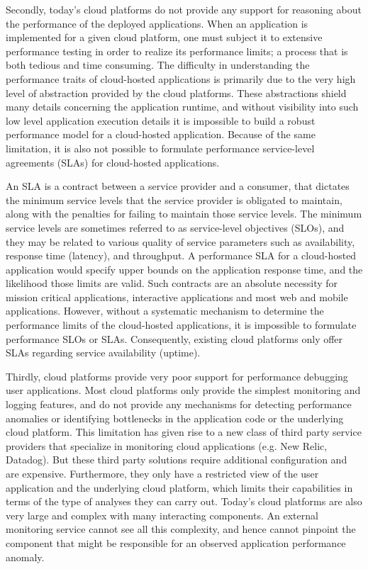 Secondly, today's cloud platforms do not provide any support for reasoning about the 
performance of the deployed applications. When an application is implemented for
a given cloud platform, one must subject it to extensive performance testing in order
to realize its performance limits; a process that is both 
tedious and time consuming. The difficulty in understanding the performance 
traits of cloud-hosted applications is primarily due to the very high level of 
abstraction provided by the cloud platforms. These abstractions shield many details 
concerning the application runtime, and without visibility into such low level application 
execution details it is impossible
to build a robust performance model for a cloud-hosted application. Because of the same
limitation, it is also not possible to formulate performance service-level agreements (SLAs)
for cloud-hosted applications. 

An SLA is a contract between a service provider and a consumer, that dictates the minimum
service levels that the service provider is obligated to maintain, along with the 
penalties for failing to maintain those service levels. The minimum service levels are sometimes
referred to as service-level objectives (SLOs), and they may be related to various quality of service
parameters such as availability, response time (latency), and throughput. A performance SLA for 
a cloud-hosted application
would specify upper bounds on the application response time, and the likelihood those limits
are valid. Such contracts are an absolute necessity for
mission critical applications, interactive applications and most web and mobile applications.
However, without a systematic mechanism to determine the performance limits of the cloud-hosted
applications, it is impossible to formulate performance SLOs or SLAs.
Consequently, existing cloud platforms only offer SLAs regarding service availability (uptime). 

Thirdly, cloud platforms provide very poor support for performance debugging
user applications. Most cloud platforms only provide the simplest monitoring and logging features,
and do not provide any mechanisms for detecting performance anomalies or identifying
bottlenecks in the application code or the underlying cloud platform. This limitation has given rise
to a new class of third party service providers that specialize in monitoring cloud applications
(e.g. New Relic, Datadog). But these third party solutions require additional configuration 
and are expensive.
Furthermore, they only have a restricted view of the user application and the underlying
cloud platform, which limits their capabilities in terms of the type of analyses they can carry out.
Today's cloud platforms are also very large and complex with many interacting components.
An external monitoring service cannot see all this complexity, and hence cannot pinpoint
the component that might be responsible for an observed application performance anomaly.

